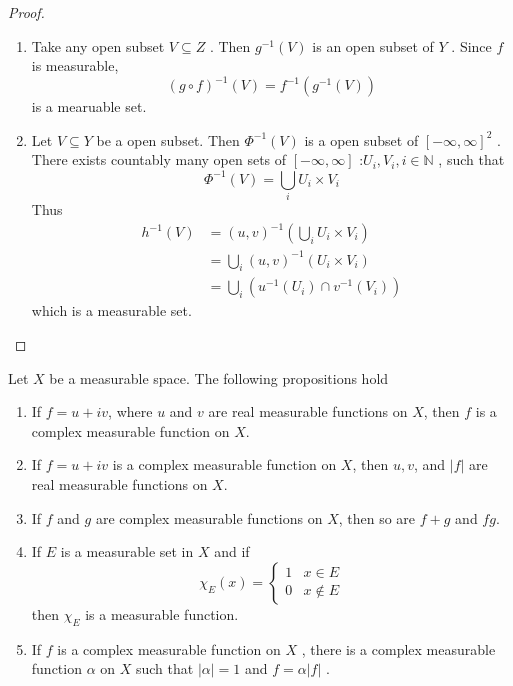 \documentclass[../main.tex]{subfiles}
\begin{document}
\begin{proof}
    \begin{enumerate}
        \item Take any open subset \(  V\subseteq Z  \) .  Then \(  g^{-1} \left( V \right)    \)  is an open subset of \(  Y  \) . Since \(  f  \) is measurable,  \[
        \left( g\circ f \right)^{-1} \left( V \right)=  f^{-1} \left( g^{-1} \left( V \right)  \right)   
        \] is a mearuable set. 
        \item    Let \(  V\subseteq Y   \) be a open subset.  Then \(  \Phi ^{-1} \left( V \right)   \) is a open subset of  \(  \left[ -\infty,\infty \right]^{2}   \) . There exists countably many open sets of \(  \left[ -\infty,\infty \right]   \)   :\(  U_{i},V_{i}, i \in \mathbb{N}   \) , such that  \[
        \Phi ^{-1} \left( V \right)= \bigcup _{i}U_{i}\times V_{i} 
        \]   Thus \[
        \begin{aligned}
        h^{-1} \left( V \right)&= \left( u,v \right)^{-1} \left( \bigcup _{i}U_{i}\times V_{i} \right)\\ 
         &=  \bigcup _{i} \left( u,v \right)^{-1} \left( U_{i}\times V_{i} \right)\\ 
          &= \bigcup _{i}\left( u^{-1} \left( U_{i} \right)\cap v^{-1} \left( V_{i} \right)   \right)    
        \end{aligned}  
        \] which is a measurable set.
    \end{enumerate}
    
\end{proof}
\begin{corollary}{}{}
    Let \(  X  \) be a measurable space. The following propositions hold
    \begin{enumerate}
        \item If \(  f =  u+ iv  \), where \(  u  \) and \(  v   \) are real measurable functions on \(  X  \), then \(  f   \) is a  complex measurable function on \(  X  \). 
        \item If \(  f= u+ iv  \) is a complex measurable function on \(  X  \), then \(  u,v  \), and \(  \left| f \right|   \) are real measurable functions on \(  X  \). 
        \item If \(  f  \) and \(  g  \) are complex measurable functions on \(  X  \), then so are \(  f+ g  \) and \(  fg  \).
        \item If \(  E  \) is a measurable set in \(  X  \) and if \[
        \chi _{E}\left( x \right)= \begin{cases} 1& x\in E\\ 
         0&x\not\in  E \end{cases}  
        \] then \(  \chi _{E}  \) is a measurable function.
        \item If \(  f  \) is a complex measurable function on \(  X  \) , there is a complex measurable function \(  \alpha   \) on \(  X  \) such that \(  \left| \alpha  \right|=  1   \)                         and \(  f= \alpha \left| f \right|   \) .  
    \end{enumerate}
     
    
\end{corollary}
\end{document}
